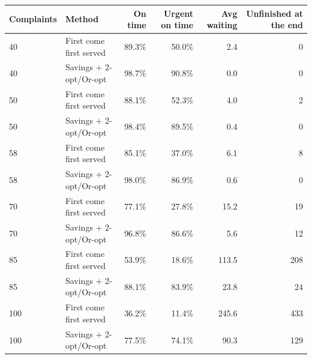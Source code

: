 \begin{tabular}{llrrrr}
\toprule
\textbf{Complaints} & \textbf{Method} & \textbf{On time} & \textbf{Urgent on time} & \textbf{Avg waiting} & \textbf{Unfinished at the end} \\
\midrule
40 & First come first served & 89.3\% & 50.0\% & 2.4 & 0 \\
40 & Savings + 2-opt/Or-opt & 98.7\% & 90.8\% & 0.0 & 0 \\
50 & First come first served & 88.1\% & 52.3\% & 4.0 & 2 \\
50 & Savings + 2-opt/Or-opt & 98.4\% & 89.5\% & 0.4 & 0 \\
58 & First come first served & 85.1\% & 37.0\% & 6.1 & 8 \\
58 & Savings + 2-opt/Or-opt & 98.0\% & 86.9\% & 0.6 & 0 \\
70 & First come first served & 77.1\% & 27.8\% & 15.2 & 19 \\
70 & Savings + 2-opt/Or-opt & 96.8\% & 86.6\% & 5.6 & 12 \\
85 & First come first served & 53.9\% & 18.6\% & 113.5 & 208 \\
85 & Savings + 2-opt/Or-opt & 88.1\% & 83.9\% & 23.8 & 24 \\
100 & First come first served & 36.2\% & 11.4\% & 245.6 & 433 \\
100 & Savings + 2-opt/Or-opt & 77.5\% & 74.1\% & 90.3 & 129 \\
\bottomrule
\end{tabular}
